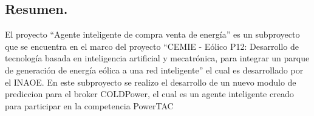 \begin{center}
	\section*{Resumen.}   
El proyecto ``Agente inteligente de compra venta de energía'' es un subproyecto que se encuentra en el marco del proyecto 
``CEMIE - Eólico P12: Desarrollo de tecnología basada en inteligencia artificial y mecatrónica, para integrar un parque de generación de energía eólica a una red inteligente'' 
el cual es desarrollado por el INAOE. 
En este subproyecto se realizo el desarrollo de un nuevo modulo de prediccion para el broker COLDPower, el cual es un agente inteligente creado para participar en la competencia PowerTAC


\end{center}